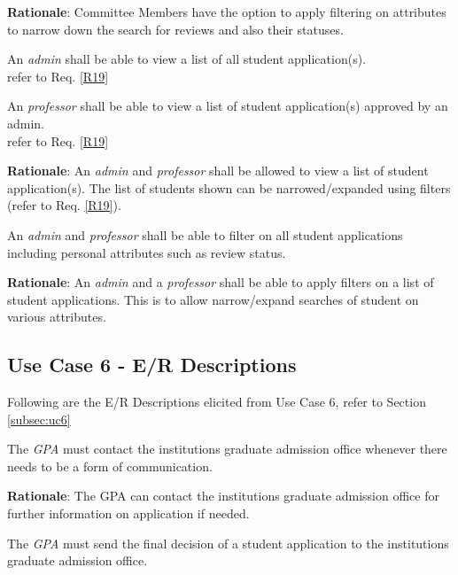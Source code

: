 \documentclass[fontsize=12pt,paper=letter,twoside]{scrartcl}
\begin{document}
\smallskip
\noindent \textbf{Rationale}: Committee Members have the option to apply filtering on attributes to narrow down the search for reviews and also their statuses.

\rdescription
{An \emph{admin} shall be able to view a list of all student application(s).\\}
{refer to Req. \ref{R19}}
\label{R17}

\rdescription
{An \emph{professor} shall be able to view a list of student application(s) approved by an admin.\\}
{refer to Req. \ref{R19}}
\label{R18}

\smallskip
\noindent \textbf{Rationale}: An \emph{admin} and \emph{professor} shall be allowed to view a list of student application(s). The list of students shown can be narrowed/expanded using filters (refer to Req. \ref{R19}).

\genreq
{An \emph{admin} and \emph{professor} shall be able to filter on all student applications including personal attributes such as review status.\\}
{}
\label{R19}

\smallskip
\noindent \textbf{Rationale}: An \emph{admin} and a \emph{professor} shall be able to apply filters on a list of student applications. This is to allow narrow/expand searches of student on various attributes.

\subsection{Use Case 6 - E/R Descriptions}

Following are the E/R Descriptions elicited from Use Case 6, refer to Section \ref{subsec:uc6}

\genenv
{The \emph{GPA} must contact the institutions graduate admission office whenever there needs to be a form of communication. \\}
{}
\label{E4}

\smallskip
\noindent \textbf{Rationale}: The GPA can contact the institutions graduate admission office for further information on application if needed.

\genenv
{The \emph{GPA} must send the final decision of a student application to the institutions graduate admission office. \\}
{}
\label{E5}
\end{document}
